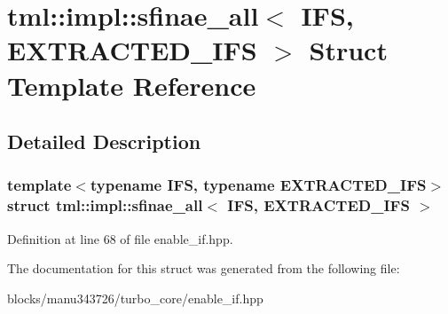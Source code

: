 \hypertarget{structtml_1_1impl_1_1sfinae__all}{\section{tml\+:\+:impl\+:\+:sfinae\+\_\+all$<$ I\+F\+S, E\+X\+T\+R\+A\+C\+T\+E\+D\+\_\+\+I\+F\+S $>$ Struct Template Reference}
\label{structtml_1_1impl_1_1sfinae__all}
}


\subsection{Detailed Description}
\subsubsection*{template$<$typename I\+F\+S, typename E\+X\+T\+R\+A\+C\+T\+E\+D\+\_\+\+I\+F\+S$>$struct tml\+::impl\+::sfinae\+\_\+all$<$ I\+F\+S, E\+X\+T\+R\+A\+C\+T\+E\+D\+\_\+\+I\+F\+S $>$}



Definition at line 68 of file enable\+\_\+if.\+hpp.



The documentation for this struct was generated from the following file\+:\begin{DoxyCompactItemize}
\item 
blocks/manu343726/turbo\+\_\+core/enable\+\_\+if.\+hpp\end{DoxyCompactItemize}
